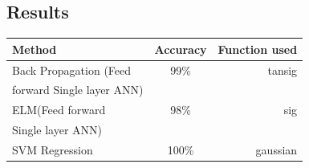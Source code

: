 \documentclass[conference]{IEEEtran}
\begin{document}
\subsection{Results}
\begin{center}
  \begin{tabular}{ | l | c  | r |}
    \hline
    Method & Accuracy  & Function used\\ \hline
    Back Propagation (Feed  & 99\% & tansig \\ 
    forward Single layer ANN)&   &         \\ \hline
    ELM(Feed forward&98\% & sig \\ 
     Single layer ANN)&& \\ \hline
    SVM Regression&100\%& gaussian\\ 
    \hline
  \end{tabular}




\end{center}
%
%



%
%
\end{document}
